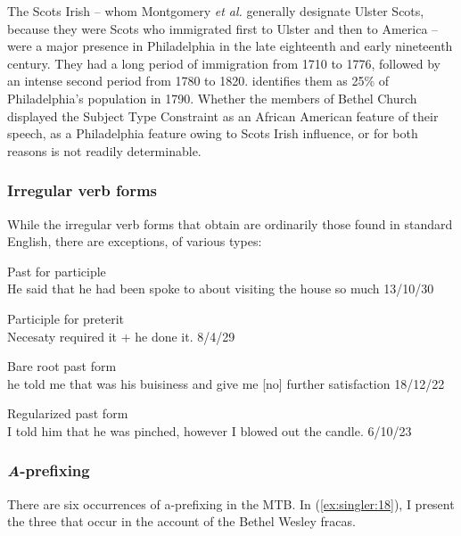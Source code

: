 \documentclass[output=paper,colorlinks,citecolor=brown]{langscibook}
\begin{document}
The Scots Irish -- whom Montgomery \textit{et al.} generally designate Ulster Scots, because they were Scots who immigrated first to Ulster and then to America -- were a major presence in Philadelphia in the late eighteenth and early nineteenth century. They had a long period of immigration from 1710 to 1776, followed by an intense second period from 1780 to 1820. \citet{Ridner2017} identifies them as 25\% of Philadelphia’s population in 1790. Whether the members of Bethel Church displayed the Subject Type Constraint as an African American feature of their speech, as a Philadelphia feature owing to Scots Irish influence, or for both reasons is not readily determinable. 

\subsubsection{Irregular verb forms} \label{sec:singler 3.3.3}

While the irregular verb forms that obtain are ordinarily those found in standard English, there are exceptions, of various types:



\ea%
  Past for participle\\
    \label{ex:singler:14}
He said that he had been spoke to about visiting the house so much 13/10/30 
    \z

 

\ea%
  Participle for preterit\\
    \label{ex:singler:15}
Necesaty required it + he done it. 8/4/29
    \z

 

\ea%
  Bare root past form\\
    \label{ex:singler:16}
  he told me that was his buisiness and give me [no] further satisfaction 18/12/22    
    \z

         


\ea%
  Regularized past form\\
    \label{ex:singler:17}
I told him that he was pinched, however I blowed out the candle. 6/10/23
    \z


\subsubsection{\textit{A}{}-prefixing} \label{sec:singler 3.3.4}

There are six occurrences of a-prefixing in the MTB. In (\ref{ex:singler:18}), I present the three that occur in the account of the Bethel Wesley fracas.
\end{document}
